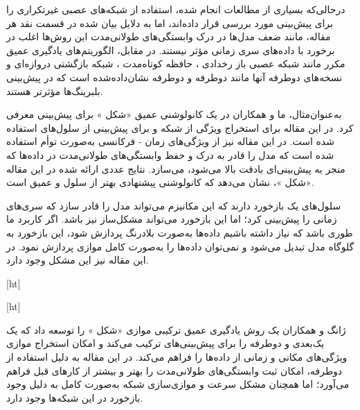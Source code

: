 درحالی‌که بسیاری از مطالعات انجام شده، استفاده از شبکه‌های عصبی غیرتکراری را برای پیش‌بینی  مورد بررسی قرار داده‌اند، اما به دلایل بیان شده در قسمت نقد هر مقاله، مانند ضعف مدل‌ها در درک وابستگی‌های طولانی‌مدت این روش‌ها اغلب در برخورد با داده‌های سری زمانی مؤثر نیستند. در مقابل، الگوریتم‌های یادگیری عمیق مکرر مانند شبکه عصبی باز رخدادی ، حافظه کوتاه‌مدت ، شبکه بازگشتی دروازه‌ای  و نسخه‌های دوطرفه آنها مانند  دوطرفه  و  دوطرفه نشان‌داده‌شده است که در پیش‌بینی  بلبرینگ‌ها مؤثرتر هستند. 





به‌عنوان‌مثال، ما و همکاران در  یک  کانولوشنی عمیق «شکل » برای پیش‌بینی  معرفی کرد. در این مقاله برای استخراج ویژگی از شبکه  و برای پیش‌بینی از سلول‌های  استفاده شده است. در این مقاله نیز از ویژگی‌های زمان - فرکانسی به‌صورت توأم استفاده شده است که مدل را قادر به درک و حفظ وابستگی‌های طولانی‌مدت در داده‌ها که منجر به پیش‌بینی‌ای بادقت بالا می‌شود، می‌سازد. نتایج عددی ارائه شده در این مقاله «شکل »، نشان می‌دهد که  کانولوشنی پیشنهادی بهتر از سلول  و  عمیق است.



سلول‌های  یک بازخورد دارند که این مکانیزم می‌تواند مدل را قادر سازد که سری‌های زمانی را پیش‌بینی کرد؛ اما این بازخورد می‌تواند مشکل‌ساز نیز باشد. اگر کاربرد ما طوری باشد که نیاز داشته باشیم داده‌ها به‌صورت بلادرنگ پردازش شود، این بازخورد به گلوگاه مدل تبدیل می‌شود و نمی‌توان داده‌ها را به‌صورت کامل موازی پردازش نمود. در این مقاله نیز این مشکل وجود دارد.




[ht]



[ht]





ژانگ و همکاران  یک روش یادگیری عمیق ترکیبی موازی «شکل » را توسعه داد که یک  یک‌بعدی و  دوطرفه را برای پیش‌بینی‌های  ترکیب می‌کند و امکان استخراج موازی ویژگی‌های مکانی و زمانی از داده‌ها را فراهم می‌کند. در این مقاله به دلیل استفاده از  دوطرفه، امکان ثبت وابستگی‌های طولانی‌مدت را بهتر و بیشتر از کارهای قبل فراهم می‌آورد؛ اما همچنان مشکل سرعت و موازی‌سازی شبکه به‌صورت کامل به دلیل وجود بازخورد در این شبکه‌ها وجود دارد.

